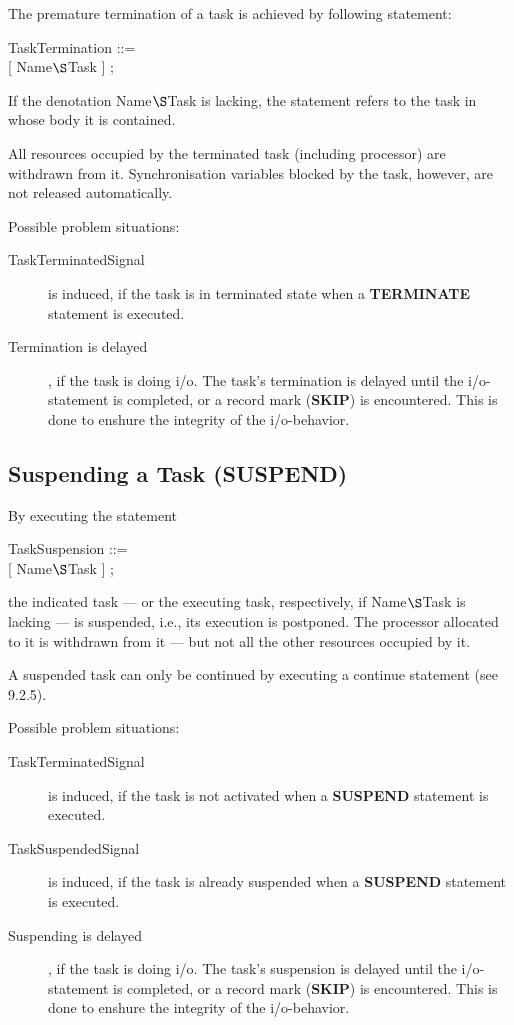 The premature termination of a task is achieved by following
statement:

TaskTermination ::= \\
 [ Name$\S $Task ] ;

If the denotation Name$\S $Task is lacking, the statement refers to
the task in whose body it is contained.

All resources occupied by the terminated task (including processor) are
withdrawn from it. Synchronisation variables blocked by the task,
however, are not released automatically.

\begin{added}
Possible problem situations:
\begin{description}
\item[TaskTerminatedSignal] is induced, if the task is in terminated state
 when a {\bf TERMINATE} statement is executed.
\item[Termination is delayed], if the task is doing i/o. The task's termination
is delayed until the i/o-statement is completed, or a record mark ({\bf SKIP}) 
is encountered.  This is done to enshure the integrity of the i/o-behavior.
\end{description}
\end{added}

\subsection{Suspending a Task (SUSPEND)}   %

By executing the statement

TaskSuspension ::=\\
 [ Name$\S $Task ] ;

the indicated task --- or the executing task, respectively, if
Name$\S $Task is lacking --- is suspended, i.e., its execution is
postponed. The processor allocated to it is withdrawn from it --- but
not all the other resources occupied by it.

A suspended task can only be continued by executing a continue
statement (see 9.2.5).

\begin{added}
Possible problem situations:
\begin{description}
\item[TaskTerminatedSignal] is induced, if the task is not activated when 
a {\bf SUSPEND} statement is executed.
\item[TaskSuspendedSignal] is induced, if the task is already suspended when
a {\bf SUSPEND} statement is executed.
\item[Suspending is delayed], if the task is doing i/o. The task's suspension
is delayed until the i/o-statement is completed, or a record mark ({\bf SKIP}) 
is encountered. This is done to enshure the integrity of the i/o-behavior.
\end{description}
\end{added}


